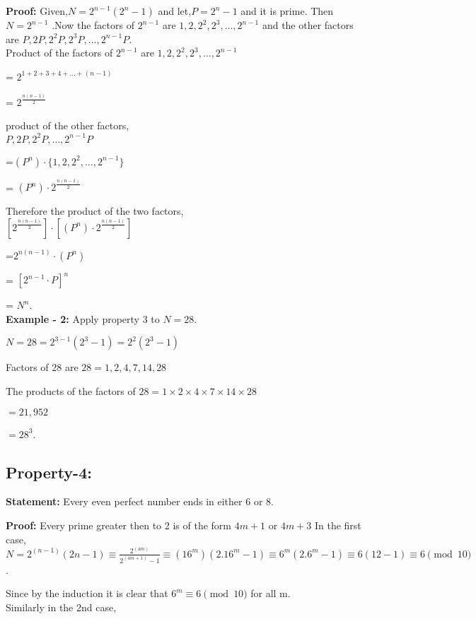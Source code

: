 \documentclass[12pt,,a4paper]{book}
\begin{document}
\textbf{Proof:}  Given,\(N = 2^{n-1}(2^n-1)\)  and let,\(P = 2^{n}-1\) and it is prime. Then \(N = 2^{n-1}\)
 .Now the factors of \(2^{n-1}\) are \(1, 2, 2^2, 2^3, \ldots, 2^{n-1}\) and  the other factors are \(P, 2P, 2^2P, 2^3P, \ldots, 2^{n-1}P\). \\
Product of the factors  of \(2^{n-1}\) are  \(1, 2, 2^2, 2^3, \ldots, 2^{n-1}\)

= \(2^{1+2+3+4+\ldots+(n-1)}\)

= \(2^{\frac{n(n-1)}{2}}\)

product of the other factors, \\
\(P, 2P, 2^2P, \ldots, 2^{n-1}P\)

=\((P^n) \cdot \{1, 2, 2^2, \ldots, 2^{n-1}\}\)

= \((P^n) \cdot 2^{\frac{n(n-1)}{2}}\)

Therefore the product of the two factors,\\
\([2^{\frac{n(n-1)}{2}}] \cdot [(P^n) \cdot 2^{\frac{n(n-1)}{2}}]\)

=\(2^{n(n-1)} \cdot (P^n)\)

 = \([{2^{n-1} \cdot P}]^n\)

 = \(N^n\).\\

 \textbf{Example - 2:} Apply property 3 to \(N = 28\). 

\(N = 28 = 2^{3-1}(2^3-1) = 2^2(2^3-1)\)


Factors of 28 are \(28 = 1,2,4,7,14,28\)


The products of the factors of \(28 = 1 \times 2 \times 4 \times 7 \times 14 \times 28\)

\(= 21,952\)


\(= 28^3\).\\

\subsection{Property-4:}
\textbf{Statement:} Every even perfect number ends in either 6 or 8.

\textbf{Proof:}  Every prime greater then to 2 is of the form \(4m + 1\) or \(4m + 3\)
 In the first case,\\
\(N = 2^{(n-1)}(2n-1) \equiv \frac{2^{(4m)}}{2^{(4m+1)}-1} \equiv (16^m)(2.{16^m}-1) \equiv 6^m(2.{6^m}-1) \equiv 6(12-1) \equiv 6 \pmod{10}\).

Since by the induction it is clear that \(6^m \equiv 6 \pmod{10}\) for all m. \\
Similarly in the 2nd case,
\end{document}
